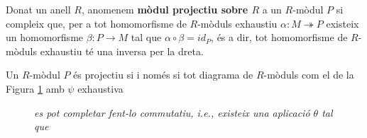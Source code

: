 \begin{definition}
 Donat un anell $R$, anomenem \textbf{mòdul projectiu sobre $R$} a un $R$-mòdul $P$ si compleix que, per a tot homomorfisme de $R$-mòduls exhaustiu $\alpha: M \twoheadrightarrow P$ existeix un homomorfisme $\beta: P \rightarrow M$ tal que $\alpha \circ \beta = id_P$, és a dir, tot homomorfisme de $R$-mòduls exhaustiu té una inversa per la dreta.
\end{definition}

\begin{lemma}
Un $R$-mòdul $P$ és projectiu si i només si tot diagrama de $R$-mòduls com el de la Figura \ref{DR-M} amb $\psi$ exhaustiva
\begin{figure}[!htb]
\begin{flushright}
\caption{}
\label{DR-M}
\end{flushright}
\endminipage\hfill
{}
\textit{es pot completar fent-lo commutatiu, i.e., existeix una aplicació $\theta$ tal que} 


\endminipage\hfill
{}%
\endminipage
\end{figure}
\end{lemma}


